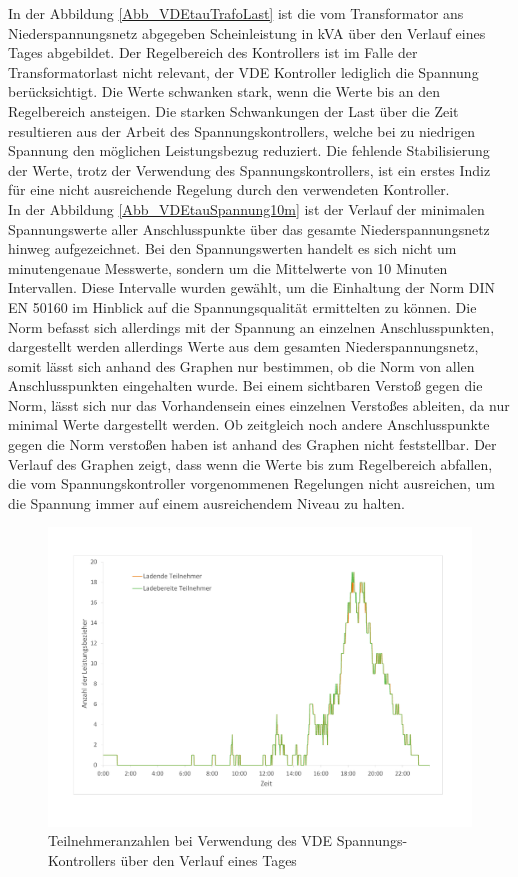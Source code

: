 In der Abbildung \ref{Abb_VDEtauTrafoLast} ist die vom Transformator ans Niederspannungsnetz abgegeben Scheinleistung in kVA über den Verlauf eines Tages abgebildet. Der Regelbereich des Kontrollers ist im Falle der Transformatorlast nicht relevant, der VDE Kontroller lediglich die Spannung berücksichtigt. Die Werte schwanken stark, wenn die Werte bis an den Regelbereich ansteigen. Die starken Schwankungen der Last über die Zeit resultieren aus der Arbeit des Spannungskontrollers, welche bei zu niedrigen Spannung den möglichen Leistungsbezug reduziert. Die fehlende Stabilisierung der Werte, trotz der Verwendung des Spannungskontrollers, ist ein erstes Indiz für eine nicht ausreichende Regelung durch den verwendeten Kontroller. \\
In der Abbildung \ref{Abb_VDEtauSpannung10m} ist der Verlauf der minimalen Spannungswerte aller Anschlusspunkte über das gesamte Niederspannungsnetz hinweg aufgezeichnet. Bei den Spannungswerten handelt es sich nicht um minutengenaue Messwerte, sondern um die Mittelwerte von 10 Minuten Intervallen. Diese Intervalle wurden gewählt, um die Einhaltung der Norm DIN EN 50160 im Hinblick auf die Spannungsqualität ermittelten zu können. Die Norm befasst sich allerdings mit der Spannung an einzelnen Anschlusspunkten, dargestellt werden allerdings Werte aus dem gesamten Niederspannungsnetz, somit lässt sich anhand des Graphen nur bestimmen, ob die Norm von allen Anschlusspunkten eingehalten wurde. Bei einem sichtbaren Verstoß gegen die Norm, lässt sich nur das Vorhandensein eines einzelnen Verstoßes ableiten, da nur minimal Werte dargestellt werden. Ob zeitgleich noch andere Anschlusspunkte gegen die Norm verstoßen haben ist anhand des Graphen nicht feststellbar. Der Verlauf des Graphen zeigt, dass wenn die Werte bis zum Regelbereich abfallen, die vom Spannungskontroller vorgenommenen Regelungen nicht ausreichen, um die Spannung immer auf einem ausreichendem Niveau zu halten.
\begin{figure}[htb]
	\centering
	\includegraphics[scale=0.45]{img/VDE_tau/Teilnehmer3.pdf}
	\caption{Teilnehmeranzahlen bei Verwendung des VDE Spannungs-Kontrollers über den Verlauf eines Tages}
	\label{Abb_VDEtauTeilnehmer}
\end{figure}

